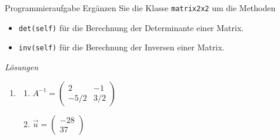 \begin{ueb}
    {Programmieraufgabe}{}
    Ergänzen Sie die Klasse \lstinline|matrix2x2| um die Methoden
    \begin{itemize}
        \item \lstinline|det(self)| für die Berechnung der Determinante einer Matrix.
        \item \lstinline|inv(self)| für die Berechnung der Inversen einer Matrix.
    \end{itemize}
\end{ueb}


\clearpage
\emph{Lösungen}
\begin{enumerate}

    \item
    \begin{enumerate}
      \item \( A^{-1} = \begin{pmatrix} 2 & -1 \\ -5/2 & 3/2 \end{pmatrix} \)
      \item \( \vec{u} = \begin{pmatrix} -28\\ 37 \end{pmatrix} \)
    \end{enumerate}
  

\end{enumerate}

